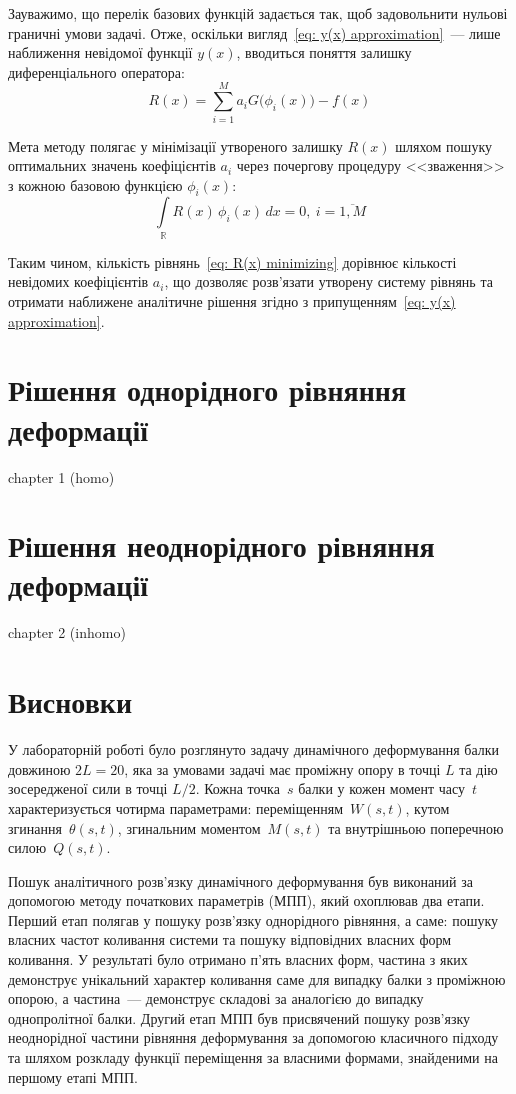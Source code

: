\documentclass{mathreport}
\begin{document}
Зауважимо, що перелік базових функцій задається так, щоб задовольнити нульові граничні умови задачі. Отже, оскільки вигляд~\eqref{eq: y(x) approximation}~--- лише наближення невідомої функції $y(x)$, вводиться поняття залишку диференціального оператора:
\begin{equation}\label{eq: R(x) residual}
    R(x) = \sum\limits_{i=1}^{M} a_i G\bigl( \phi_i(x) \bigr) - f(x)
\end{equation}

Мета методу полягає у мінімізації утвореного залишку $R(x)$ шляхом пошуку оптимальних значень коефіцієнтів $a_i$ через почергову процедуру <<зваження>> з кожною базовою функцією $\phi_i(x)$:
\begin{equation}\label{eq: R(x) minimizing}
    \int\limits_{\mathbb{R}} R(x)\, \phi_i(x)\, dx = 0,\ i=\overline{1,M}
\end{equation}

Таким чином, кількість рівнянь~\eqref{eq: R(x) minimizing} дорівнює кількості невідомих коефіцієнтів $a_i$, що дозволяє розв'язати утворену систему рівнянь та отримати наближене аналітичне рішення згідно з припущенням~\eqref{eq: y(x) approximation}.

\section{Рішення однорідного рівняння деформації}

{chapter 1 (homo)}

\section{Рішення неоднорідного рівняння деформації}

{chapter 2 (inhomo)}

\newpage
\section{Висновки}

У лабораторній роботі було розглянуто задачу динамічного деформування балки довжиною $2L=20$, яка за умовами задачі має проміжну опору в точці $L$ та дію зосередженої сили в точці $L/2$. Кожна точка~$s$ балки у кожен момент часу~$t$ характеризується чотирма параметрами: переміщенням~$W(s,t)$, кутом згинання~$\theta(s,t)$, згинальним моментом~$M(s,t)$ та внутрішньою поперечною силою~$Q(s,t)$.

Пошук аналітичного розв'язку динамічного деформування був виконаний за допомогою методу початкових параметрів (МПП), який охоплював два етапи. Перший етап полягав у пошуку розв'язку однорідного рівняння, а саме: пошуку власних частот коливання системи та пошуку відповідних власних форм коливання. У результаті було отримано п'ять власних форм, частина з яких демонструє унікальний характер коливання саме для випадку балки з проміжною опорою, а частина~--- демонструє складові за аналогією до випадку однопролітної балки. Другий етап МПП був присвячений пошуку розв'язку неоднорідної частини рівняння деформування за допомогою класичного підходу та шляхом розкладу функції переміщення за власними формами, знайденими на першому етапі МПП.
\end{document}
